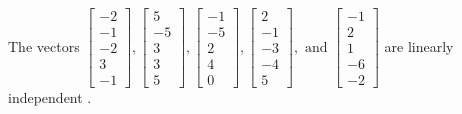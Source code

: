 \begin{exercise}
\begin{exerciseStatement}
  \end{exerciseStatement}
  \begin{exerciseAnswer}
   The vectors \(\left[\begin{array}{r}
-2 \\
-1 \\
-2 \\
3 \\
-1
\end{array}\right] , \left[\begin{array}{r}
5 \\
-5 \\
3 \\
3 \\
5
\end{array}\right] , \left[\begin{array}{r}
-1 \\
-5 \\
2 \\
4 \\
0
\end{array}\right] , \left[\begin{array}{r}
2 \\
-1 \\
-3 \\
-4 \\
5
\end{array}\right] , \text{ and } \left[\begin{array}{r}
-1 \\
2 \\
1 \\
-6 \\
-2
\end{array}\right]\) are 
  	 linearly independent  .
  


  \end{exerciseAnswer}
\end{exercise}